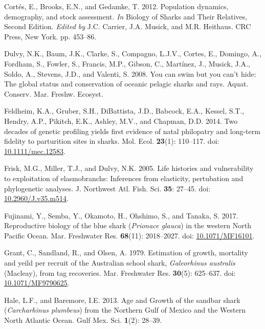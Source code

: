 \documentclass[
]{article}
\newenvironment{CSLReferences}%
  {}%
  {\par}
\begin{document}
\begin{CSLReferences}{1}{0}
Cortés, E., Brooks, E.N., and Gedamke, T. 2012. Population dynamics, demography, and stock assessment. \emph{In} Biology of {Sharks} and {Their} {Relatives}, {Second} {Edition}. \emph{Edited by} J.C. Carrier, J.A. Musick, and M.R. Heithaus. CRC Press, New York. pp. 453--86.

Dulvy, N.K., Baum, J.K., Clarke, S., Compagno, L.J.V., Cortes, E., Domingo, A., Fordham, S., Fowler, S., Francis, M.P., Gibson, C., Martínez, J., Musick, J.A., Soldo, A., Stevens, J.D., and Valenti, S. 2008. You can swim but you can't hide: The global status and conservation of oceanic pelagic sharks and rays. Aquat. Conserv. Mar. Freshw. Ecosyst.

Feldheim, K.A., Gruber, S.H., DiBattista, J.D., Babcock, E.A., Kessel, S.T., Hendry, A.P., Pikitch, E.K., Ashley, M.V., and Chapman, D.D. 2014. Two decades of genetic profiling yields first evidence of natal philopatry and long-term fidelity to parturition sites in sharks. Mol. Ecol. \textbf{23}(1): 110--117. doi: \href{https://doi.org/10.1111/mec.12583}{10.1111/mec.12583}.

Frisk, M.G., Miller, T.J., and Dulvy, N.K. 2005. Life histories and vulnerability to exploitation of elasmobranchs: {Inferences} from elasticity, pertubation and phylogenetic analyses. J. Northwest Atl. Fish. Sci. \textbf{35}: 27--45. doi: \href{https://doi.org/10.2960/J.v35.m514}{10.2960/J.v35.m514}.

Fujinami, Y., Semba, Y., Okamoto, H., Ohshimo, S., and Tanaka, S. 2017. Reproductive biology of the blue shark (\emph{{Prionace} glauca}) in the western {North} {Pacific} {Ocean}. Mar. Freshwater Res. \textbf{68}(11): 2018--2027. doi: \href{https://doi.org/10.1071/MF16101}{10.1071/MF16101}.

Grant, C., Sandland, R., and Olsen, A. 1979. Estimation of growth, mortality and yeild per recruit of the {Australian} school shark, \emph{{Galeorhinus} australis} ({Macleay}), from tag recoveries. Mar. Freshwater Res. \textbf{30}(5): 625--637. doi: \href{https://doi.org/10.1071/MF9790625}{10.1071/MF9790625}.

Hale, L.F., and Baremore, I.E. 2013. Age and {Growth} of the sandbar shark (\emph{{Carcharhinus} plumbeus}) from the {Northern} {Gulf} of {Mexico} and the {Western} {North} {Atlantic} {Ocean}. Gulf Mex. Sci. \textbf{1}(2): 28--39.


\end{CSLReferences}
\end{document}
